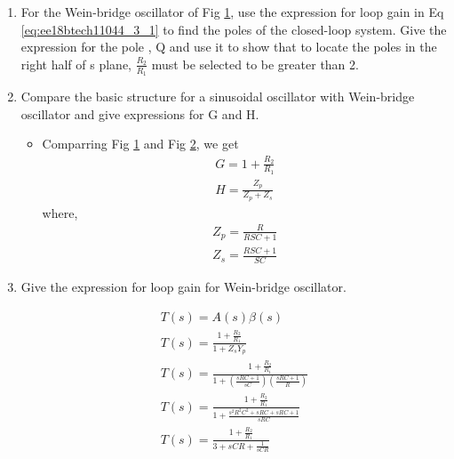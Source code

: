 \begin{enumerate}[label=\thesubsection.\arabic*.,ref=\thesubsection.\theenumi]
\item
For the Wein-bridge oscillator of Fig \ref{fig:ee18btech11044_3_tikz_1}, use the expression for loop gain in Eq \ref{eq:ee18btech11044_3_1}  to find the poles of the closed-loop system. Give the expression for the pole , Q and use it to show that to locate the poles in the right half of s plane, $\frac{R_2}{R_1}$ must be selected to be greater than 2. 

\begin{figure}[!hbt]
	\begin{center}
			\resizebox{\columnwidth}{!}{}
	\end{center}
\caption{}
\label{fig:ee18btech11044_3_tikz_1}
\end{figure}


\item Compare the basic structure for a sinusoidal oscillator with Wein-bridge oscillator and give expressions for G and H. 

\solution
\begin{itemize}
    \item Comparring Fig \ref{fig:ee18btech11044_3_tikz_1} and Fig \ref{fig:ee18btech11044_3_tikz_2}, we get
\begin{align}
G = 1+\frac{R_2}{R_1} \\
H = \frac{Z_p}{Z_p + Z_s}
\end{align}
where,
\begin{align}
    Z_p = \frac{R}{RSC+1} \\
    Z_s = \frac{RSC+1}{SC}
\end{align}
\end{itemize}



\begin{figure}[!hbt]
	\begin{center}
		\resizebox{\columnwidth}{!}{}
	\end{center}
\caption{}
\label{fig:ee18btech11044_3_tikz_2}
\end{figure} 





\item
Give the expression for loop gain for Wein-bridge oscillator. 

\solution
\begin{align}
    T(s) = A(s) \beta(s) \\ 
    T(s) = \frac{1+\frac{R_2}{R_1}}{1 + Z_s Y_p} \\
    T(s) = \frac{1+\frac{R_2}{R_1}}{1 + (\frac{sRC + 1}{sC}) (\frac{sRC+1}{R})} \\
    T(s) = \frac{1+\frac{R_2}{R_1}}{1 + \frac{s^2R^2C^2 +sRC + sRC + 1}{sRC}} \\
    T(s) = \frac{1 + \frac{R_2}{R_1}}{3 + sCR + \frac{1}{sCR}} \label{eq:ee18btech11044_3_1}
\end{align}


\end{enumerate}
